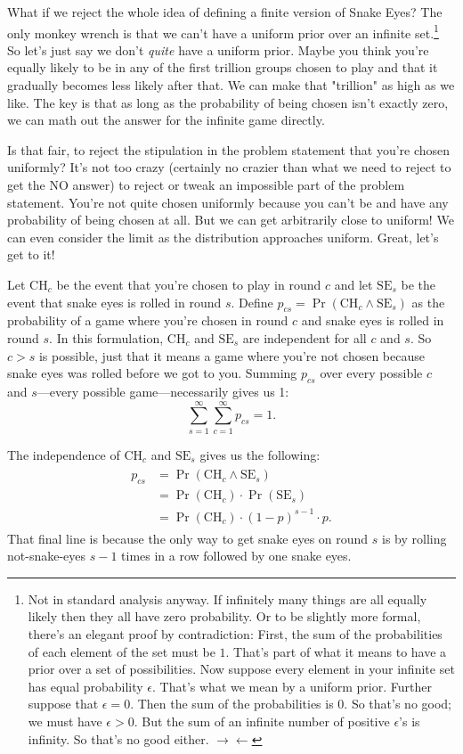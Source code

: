 \documentclass[article,twocolumn]{memoir}
\begin{document}
What if we reject the whole idea of defining a finite version of Snake Eyes?
The only monkey wrench is that we can't have a uniform prior over an infinite set.\footnote{
Not in standard analysis anyway.
If infinitely many things are all equally likely then they all have zero probability.
Or to be slightly more formal, there's an elegant proof by contradiction:
First, the sum of the probabilities of each element of the set must be $1$.
That's part of what it means to have a prior over a set of possibilities.
Now suppose every element in your infinite set has equal probability $\epsilon$.
That's what we mean by a uniform prior.
Further suppose that $\epsilon=0$.
Then the sum of the probabilities is $0$.
So that's no good; we must have $\epsilon>0$.
But the sum of an infinite number of positive $\epsilon$'s is infinity.
So that's no good either.
$\rightarrow\leftarrow$
}
So let's just say we don't \emph{quite} have a uniform prior.
Maybe you think you're equally likely to be in any of the first trillion groups chosen to play and that it gradually becomes less likely after that.
We can make that "trillion" as high as we like.
The key is that as long as the probability of being chosen isn't exactly zero, we can math out the answer for the infinite game directly.

Is that fair, to reject the stipulation in the problem statement that you're chosen uniformly?
It's not too crazy (certainly no crazier than what we need to reject to get the NO answer) to reject or tweak an impossible part of the problem statement.
You're not quite chosen uniformly because you can't be and have any probability of being chosen at all.
But we can get arbitrarily close to uniform!
We can even consider the limit as the distribution approaches uniform.
Great, let's get to it!

Let $\text{CH}_c$ be the event that you're chosen to play in round $c$ and let $\text{SE}_s$ be the event that snake eyes is rolled in round $s$.
Define 
$p_{cs} = \Pr(\text{CH}_c\land \text{SE}_s)$ 
as the probability of a game where you're chosen in round $c$ and snake eyes is rolled in round $s$.
In this formulation, $\text{CH}_c$ and $\text{SE}_s$ are independent for all $c$ and $s$.
So $c>s$ is possible, just that it means a game where you're not chosen because snake eyes was rolled before we got to you.
Summing $p_{cs}$ over every possible $c$ and $s$---every possible game---necessarily gives us 1:
$$
\sum_{s=1}^\infty \sum_{c=1}^\infty p_{cs} = 1.
$$

The independence of $\text{CH}_c$ and $\text{SE}_s$ gives us the following:
\begin{align}\label{pcs}
\begin{split}
p_{cs} & = \Pr(\text{CH}_c\land\text{SE}_s) \\
       & = \Pr(\text{CH}_c)\cdot\Pr(\text{SE}_s) \\
       & = \Pr(\text{CH}_c)\cdot(1-p)^{s-1}\cdot p.
\end{split}
\end{align}
That final line is because the only way to get snake eyes on round $s$ is by rolling not-snake-eyes $s-1$ times in a row followed by one snake eyes.
\end{document}
